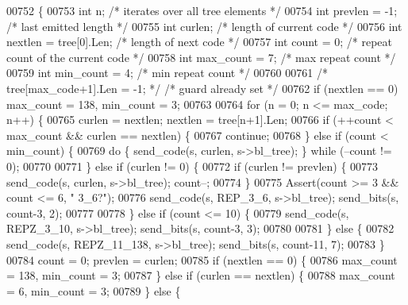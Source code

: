 \begin{DoxyCode}
{{{{{{{{{{{{{00752 \{
00753     \textcolor{keywordtype}{int} n;                     \textcolor{comment}{/* iterates over all tree elements */}
00754     \textcolor{keywordtype}{int} prevlen = -1;          \textcolor{comment}{/* last emitted length */}
00755     \textcolor{keywordtype}{int} curlen;                \textcolor{comment}{/* length of current code */}
00756     \textcolor{keywordtype}{int} nextlen = tree[0].Len; \textcolor{comment}{/* length of next code */}
00757     \textcolor{keywordtype}{int} count = 0;             \textcolor{comment}{/* repeat count of the current code */}
00758     \textcolor{keywordtype}{int} max\_count = 7;         \textcolor{comment}{/* max repeat count */}
00759     \textcolor{keywordtype}{int} min\_count = 4;         \textcolor{comment}{/* min repeat count */}
00760 
00761     \textcolor{comment}{/* tree[max\_code+1].Len = -1; */}  \textcolor{comment}{/* guard already set */}
00762     \textcolor{keywordflow}{if} (nextlen == 0) max\_count = 138, min\_count = 3;
00763 
00764     \textcolor{keywordflow}{for} (n = 0; n <= max\_code; n++) \{
00765         curlen = nextlen; nextlen = tree[n+1].Len;
00766         \textcolor{keywordflow}{if} (++count < max\_count && curlen == nextlen) \{
00767             \textcolor{keywordflow}{continue};
00768         \} \textcolor{keywordflow}{else} \textcolor{keywordflow}{if} (count < min\_count) \{
00769             \textcolor{keywordflow}{do} \{ send\_code(s, curlen, s->bl\_tree); \} \textcolor{keywordflow}{while} (--count != 0);
00770 
00771         \} \textcolor{keywordflow}{else} \textcolor{keywordflow}{if} (curlen != 0) \{
00772             \textcolor{keywordflow}{if} (curlen != prevlen) \{
00773                 send\_code(s, curlen, s->bl\_tree); count--;
00774             \}
00775             Assert(count >= 3 && count <= 6, \textcolor{stringliteral}{" 3\_6?"});
00776             send\_code(s, REP\_3\_6, s->bl\_tree); send\_bits(s, count-3, 2);
00777 
00778         \} \textcolor{keywordflow}{else} \textcolor{keywordflow}{if} (count <= 10) \{
00779             send\_code(s, REPZ\_3\_10, s->bl\_tree); send\_bits(s, count-3, 3);
00780 
00781         \} \textcolor{keywordflow}{else} \{
00782             send\_code(s, REPZ\_11\_138, s->bl\_tree); send\_bits(s, count-11, 7);
00783         \}
00784         count = 0; prevlen = curlen;
00785         \textcolor{keywordflow}{if} (nextlen == 0) \{
00786             max\_count = 138, min\_count = 3;
00787         \} \textcolor{keywordflow}{else} \textcolor{keywordflow}{if} (curlen == nextlen) \{
00788             max\_count = 6, min\_count = 3;
00789         \} \textcolor{keywordflow}{else} \{
}}}}}}}}}}}}}
\end{DoxyCode}
